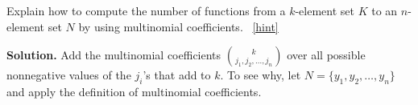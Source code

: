 \documentclass{book}
\begin{document}
\setcounter{project}{282}
\addtocounter{project}{-1}
\begin{activity}[]\label{activity-275}
\hypertarget{p-1503}{}%
Explain how to compute the number of functions from a \(k\)-element set \(K\) to an \(n\)-element set \(N\) by using multinomial coefficients.%
~\hfill{\tiny\hyperlink{a-282}{[hint]}\hypertarget{q-282}{}}\par\smallskip%
\noindent\textbf{Solution.}\hypertarget{solution-225}{}\quad%
\hypertarget{p-1505}{}%
Add the multinomial coefficients \(\binom{k}{j_1,j_2,\ldots,j_n}\) over all possible nonnegative values of the \(j_i\)'s that add to \(k\).  To see why, let \(N=\{y_1,y_2,\ldots,y_n\}\) and apply the definition of multinomial coefficients.%
\end{activity}
\end{document}
